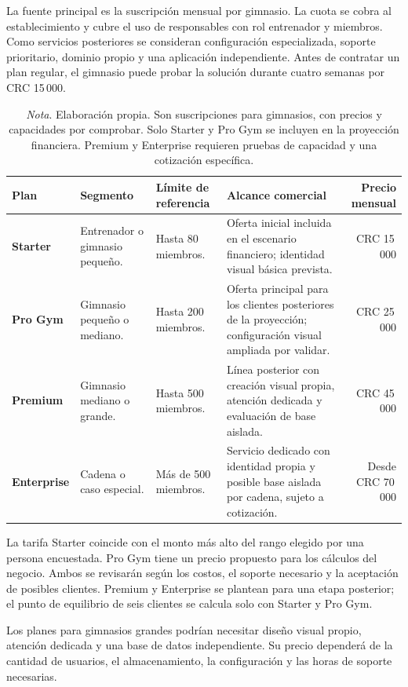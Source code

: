 La fuente principal es la suscripción mensual por gimnasio. La cuota se cobra al
establecimiento y cubre el uso de responsables con rol entrenador y miembros. Como
servicios posteriores se consideran configuración especializada, soporte
prioritario, dominio propio y una aplicación independiente. Antes de contratar
un plan regular, el gimnasio puede probar la solución durante cuatro semanas por
CRC 15\,000.

\begin{table}[htbp]
\caption{Estructura comercial propuesta para Pulso}
\label{tab:planes}
\begin{tabularx}{\textwidth}{>{\bfseries}p{2.0cm}p{2.5cm}p{2.1cm}X r}
\toprule
Plan & Segmento & Límite de referencia & Alcance comercial & Precio mensual \\
\midrule
Starter & Entrenador o gimnasio pequeño. & Hasta 80 miembros. & Oferta inicial incluida en el escenario financiero; identidad visual básica prevista. & CRC 15\,000 \\
Pro Gym & Gimnasio pequeño o mediano. & Hasta 200 miembros. & Oferta principal para los clientes posteriores de la proyección; configuración visual ampliada por validar. & CRC 25\,000 \\
Premium & Gimnasio mediano o grande. & Hasta 500 miembros. & Línea posterior con creación visual propia, atención dedicada y evaluación de base aislada. & CRC 45\,000 \\
Enterprise & Cadena o caso especial. & Más de 500 miembros. & Servicio dedicado con identidad propia y posible base aislada por cadena, sujeto a cotización. & Desde CRC 70\,000 \\
\bottomrule
\end{tabularx}
\caption*{\textit{Nota}. Elaboración propia. Son suscripciones para gimnasios, con precios y capacidades por comprobar. Solo Starter y Pro Gym se incluyen en la proyección financiera. Premium y Enterprise requieren pruebas de capacidad y una cotización específica.}
\end{table}

La tarifa Starter coincide con el monto más alto del rango elegido por una
persona encuestada. Pro Gym tiene un precio propuesto para los cálculos del
negocio. Ambos se revisarán según los costos, el soporte necesario y la
aceptación de posibles clientes. Premium y Enterprise se plantean para una
etapa posterior; el punto de equilibrio de seis clientes se calcula solo con
Starter y Pro Gym.

Los planes para gimnasios grandes podrían necesitar diseño visual propio,
atención dedicada y una base de datos independiente. Su precio dependerá de la
cantidad de usuarios, el almacenamiento, la configuración y las horas de
soporte necesarias.


